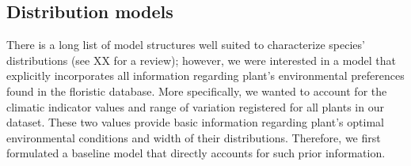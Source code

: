 \documentclass[11pt, a4paper]{article}
\begin{document}
\subsection*{Distribution models}
There is a long list of model structures well suited to characterize species' distributions (see XX for a review); however, we were interested in a model that explicitly incorporates all information regarding plant's environmental preferences found in the floristic database. More specifically, we wanted to account for the climatic indicator values and range of variation registered for all plants in our dataset. These two values provide basic information regarding plant's optimal environmental conditions and width of their distributions. Therefore, we first formulated a baseline model that directly accounts for such prior information. 
\end{document}
